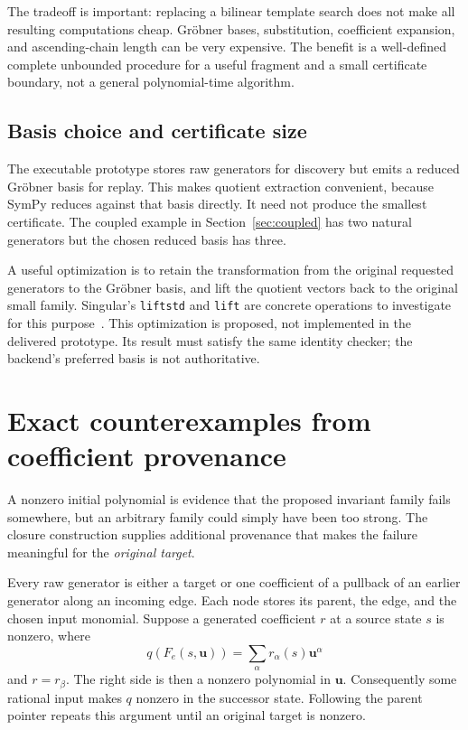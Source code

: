 \documentclass[11pt,letterpaper]{article}
\theoremstyle{definition}
\newcommand{\code}[1]{\nolinkurl{#1}}
\begin{document}
The tradeoff is important: replacing a bilinear template search does not make
all resulting computations cheap. Gr\"obner bases, substitution, coefficient
expansion, and ascending-chain length can be very expensive. The benefit is a
well-defined complete unbounded procedure for a useful fragment and a small
certificate boundary, not a general polynomial-time algorithm.

\subsection{Basis choice and certificate size}
The executable prototype stores raw generators for discovery but emits a
reduced Gr\"obner basis for replay. This makes quotient extraction convenient,
because SymPy reduces against that basis directly. It need not produce the
smallest certificate. The coupled example in Section~\ref{sec:coupled} has two
natural generators but the chosen reduced basis has three.

A useful optimization is to retain the transformation from the original
requested generators to the Gr\"obner basis, and lift the quotient vectors back
to the original small family. Singular's \code{liftstd} and \code{lift} are
concrete operations to investigate for this purpose~\cite{singular-lift}.
This optimization is proposed, not implemented in the delivered prototype.
Its result must satisfy the same identity checker; the backend's preferred
basis is not authoritative.

\section{Exact counterexamples from coefficient provenance}
\label{sec:witness}

A nonzero initial polynomial is evidence that the proposed invariant family
fails somewhere, but an arbitrary family could simply have been too strong.
The closure construction supplies additional provenance that makes the failure
meaningful for the \emph{original target}.

Every raw generator is either a target or one coefficient of a pullback of an
earlier generator along an incoming edge. Each node stores its parent, the
edge, and the chosen input monomial. Suppose a generated coefficient $r$ at a
source state $s$ is nonzero, where
\[
 q(F_e(s,\bm u))=\sum_\alpha r_\alpha(s)\bm u^\alpha
\]
and $r=r_\beta$. The right side is then a nonzero polynomial in $\bm u$.
Consequently some rational input makes $q$ nonzero in the successor state.
Following the parent pointer repeats this argument until an original target is
nonzero.
\end{document}
